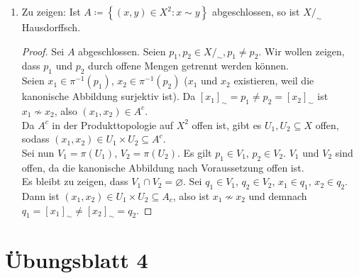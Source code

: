 \begin{solution}
\begin{enumerate}[label= (\alph*)]
    \item Zu zeigen: Ist \( A \coloneqq \left \{ (x,y) \in X^2 : x \sim y \right \} \) abgeschlossen, so ist \( X/_\sim \) Hausdorffsch.
    \begin{proof}
      Sei \( A \) abgeschlossen. Seien \( p_1, p_2 \in X/_\sim, p_1 \neq p_2 \). Wir wollen zeigen, dass \( p_1 \) und \( p_2 \) durch offene Mengen getrennt werden können. \\
      Seien \( x_1 \in \pi^{-1}(p_1) \), \( x_2 \in \pi^{-1}(p_2) \) (\( x_1 \) und \( x_2 \) existieren, weil die kanonische Abbildung surjektiv ist). Da \( {[x_1]}_\sim = p_1 \neq p_2 = {[x_2]}_\sim \) ist \( x_1 \not \sim x_2 \), also \( (x_1, x_2) \in A^c \). \\
      Da \( A^c \) in der Produkttopologie auf \( X^2 \) offen ist, gibt es \( U_1, U_2 \subseteq X \) offen, sodass \( (x_1, x_2) \in U_1 \times U_2 \subseteq A^c \). \\
      Sei nun \( V_1 = \pi(U_1) \), \( V_2 = \pi(U_2) \). Es gilt \( p_1 \in V_1 \), \( p_2 \in V_2 \). \( V_1 \) und \( V_2 \) sind offen, da die kanonische Abbildung nach Voraussetzung offen ist. \\
      Es bleibt zu zeigen, dass \( V_1 \cap V_2 = \varnothing \). Sei \( q_1 \in V_1 \), \( q_2 \in V_2 \), \( x_1 \in q_1 \), \( x_2 \in q_2 \). Dann ist \( (x_1, x_2) \in U_1 \times U_2 \subseteq A_c \), also ist \( x_1 \not \sim x_2 \) und demnach \( q_1 = {[x_1]}_\sim \neq {[x_2]}_\sim = q_2 \).
    \end{proof}
  \end{enumerate}
\end{solution}



% 
\newpage
\setcounter{problemcounter}{0}
\section{Übungsblatt 4}

